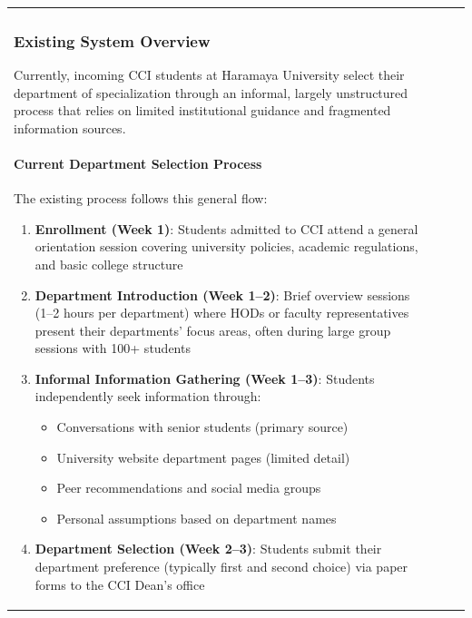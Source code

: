 \documentclass[12pt, a4paper]{article}
\begin{document}
\begin{itemize}[leftmargin=1.5em, itemsep=3pt]
\begin{table}[H]
\begin{tabularx}{\textwidth}{>{\raggedright\arraybackslash}p{0.8cm}>{\raggedright\arraybackslash}p{3.5cm}>{\raggedright\arraybackslash}X>{\raggedright\arraybackslash}p{2.5cm}}
\subsubsection{Existing System Overview}

Currently, incoming CCI students at Haramaya University select their department of specialization through an informal, largely unstructured process that relies on limited institutional guidance and fragmented information sources.

\paragraph{Current Department Selection Process}

The existing process follows this general flow:

\begin{enumerate}[leftmargin=1.5em, itemsep=3pt]
    \item \textbf{Enrollment (Week 1)}: Students admitted to CCI attend a general orientation session covering university policies, academic regulations, and basic college structure
    
    \item \textbf{Department Introduction (Week 1--2)}: Brief overview sessions (1--2 hours per department) where HODs or faculty representatives present their departments' focus areas, often during large group sessions with 100+ students
    
    \item \textbf{Informal Information Gathering (Week 1--3)}: Students independently seek information through:
    \begin{itemize}[leftmargin=1.5em, itemsep=2pt]
        \item Conversations with senior students (primary source)
        \item University website department pages (limited detail)
        \item Peer recommendations and social media groups
        \item Personal assumptions based on department names
    \end{itemize}
    
    \item \textbf{Department Selection (Week 2--3)}: Students submit their department preference (typically first and second choice) via paper forms to the CCI Dean's office
    

\end{enumerate}
\end{tabularx}
\end{table}
\end{itemize}
\end{document}
